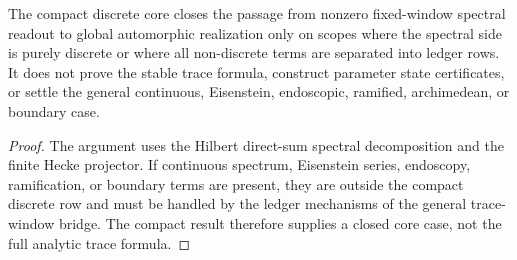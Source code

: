 \begin{theorem}
\label{thm:unified-reality-compact-discrete-boundary}
The compact discrete core closes the passage from nonzero fixed-window
spectral readout to global automorphic realization only on scopes where
the spectral side is purely discrete or where all non-discrete terms are
separated into ledger rows. It does not prove the stable trace formula,
construct parameter state certificates, or settle the general
continuous, Eisenstein, endoscopic, ramified, archimedean, or boundary
case.
\end{theorem}
\begin{proof}
The argument uses the Hilbert direct-sum spectral decomposition and the
finite Hecke projector. If continuous spectrum, Eisenstein series,
endoscopy, ramification, or boundary terms are present, they are outside
the compact discrete row and must be handled by the ledger mechanisms of
the general trace-window bridge. The compact result therefore supplies a
closed core case, not the full analytic trace formula.
\end{proof}
